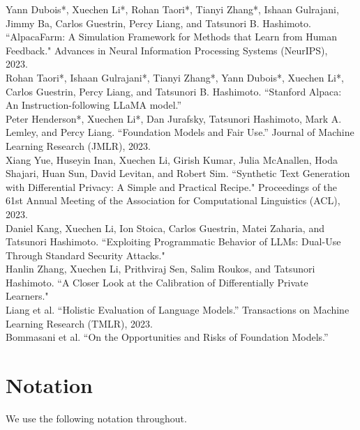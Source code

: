 \begin{verticalline}
Yann Dubois*, Xuechen Li*, Rohan Taori*, Tianyi Zhang*, Ishaan Gulrajani, Jimmy Ba, Carlos Guestrin, Percy Liang, and Tatsunori B. Hashimoto. ``AlpacaFarm: A Simulation Framework for Methods that Learn from Human Feedback."
Advances in Neural Information Processing Systems (NeurIPS), 2023.~\cite{dubois2023alpacafarm}\\

\noindent
Rohan Taori*, Ishaan Gulrajani*, Tianyi Zhang*, Yann Dubois*, Xuechen Li*, Carlos Guestrin, Percy Liang, and Tatsunori B. Hashimoto.
``Stanford Alpaca: An Instruction-following LLaMA model.''~\cite{alpaca}\\

\noindent 
Peter Henderson*, Xuechen Li*, Dan Jurafsky, Tatsunori Hashimoto, Mark A. Lemley, and Percy Liang. 
``Foundation Models and Fair Use.''
Journal of Machine Learning Research (JMLR), 2023.~\cite{henderson2023fairuse}\\

\noindent Xiang Yue, Huseyin Inan, Xuechen Li, Girish Kumar, Julia McAnallen, Hoda Shajari, Huan Sun, David Levitan, and Robert Sim. ``Synthetic Text Generation with Differential Privacy: A Simple and Practical Recipe." Proceedings of the 61st Annual Meeting of the Association for Computational Linguistics (ACL), 2023.~\cite{yue-etal-2023-synthetic}\\

\noindent 
Daniel Kang, Xuechen Li, Ion Stoica, Carlos Guestrin, Matei Zaharia, and Tatsunori Hashimoto. ``Exploiting Programmatic Behavior of LLMs: Dual-Use Through Standard Security Attacks."~\cite{kang2023exploiting}\\

\noindent 
Hanlin Zhang, Xuechen Li, Prithviraj Sen, Salim Roukos, and Tatsunori Hashimoto. 
``A Closer Look at the Calibration of Differentially Private Learners."~\cite{zhang2022closer}\\

\noindent 
Liang et al.
``Holistic Evaluation of Language Models.''
Transactions on Machine Learning Research (TMLR), 2023.~\cite{liang2023holistic}\\

\noindent 
Bommasani et al.
``On the Opportunities and Risks of Foundation Models.''~\cite{bommasani2021opportunities}

\end{verticalline}

\newpage
\section{Notation}
We use the following notation throughout.

